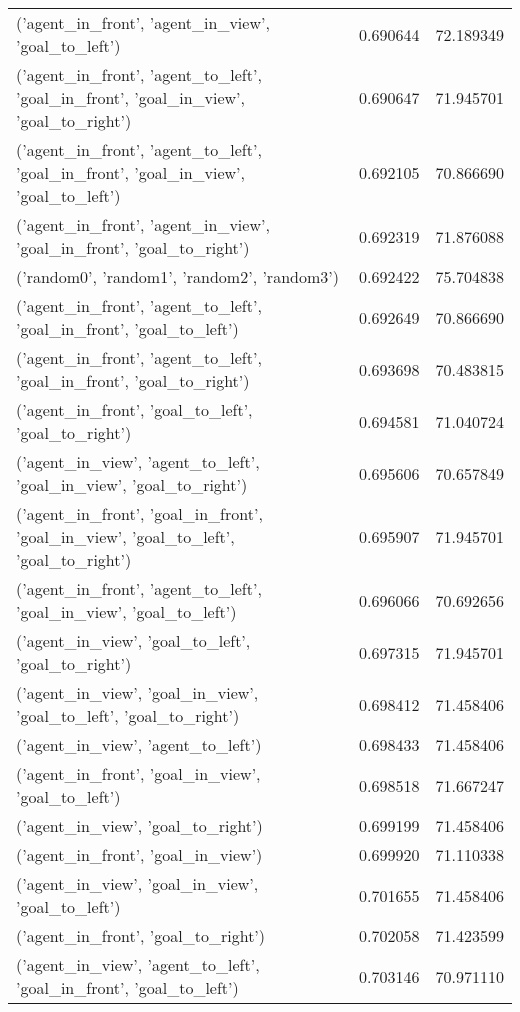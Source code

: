 \begin{tabular}{lrr}
('agent\_in\_front', 'agent\_in\_view', 'goal\_to\_left') & 0.690644 & 72.189349 \\
('agent\_in\_front', 'agent\_to\_left', 'goal\_in\_front', 'goal\_in\_view', 'goal\_to\_right') & 0.690647 & 71.945701 \\
('agent\_in\_front', 'agent\_to\_left', 'goal\_in\_front', 'goal\_in\_view', 'goal\_to\_left') & 0.692105 & 70.866690 \\
('agent\_in\_front', 'agent\_in\_view', 'goal\_in\_front', 'goal\_to\_right') & 0.692319 & 71.876088 \\
('random0', 'random1', 'random2', 'random3') & 0.692422 & 75.704838 \\
('agent\_in\_front', 'agent\_to\_left', 'goal\_in\_front', 'goal\_to\_left') & 0.692649 & 70.866690 \\
('agent\_in\_front', 'agent\_to\_left', 'goal\_in\_front', 'goal\_to\_right') & 0.693698 & 70.483815 \\
('agent\_in\_front', 'goal\_to\_left', 'goal\_to\_right') & 0.694581 & 71.040724 \\
('agent\_in\_view', 'agent\_to\_left', 'goal\_in\_view', 'goal\_to\_right') & 0.695606 & 70.657849 \\
('agent\_in\_front', 'goal\_in\_front', 'goal\_in\_view', 'goal\_to\_left', 'goal\_to\_right') & 0.695907 & 71.945701 \\
('agent\_in\_front', 'agent\_to\_left', 'goal\_in\_view', 'goal\_to\_left') & 0.696066 & 70.692656 \\
('agent\_in\_view', 'goal\_to\_left', 'goal\_to\_right') & 0.697315 & 71.945701 \\
('agent\_in\_view', 'goal\_in\_view', 'goal\_to\_left', 'goal\_to\_right') & 0.698412 & 71.458406 \\
('agent\_in\_view', 'agent\_to\_left') & 0.698433 & 71.458406 \\
('agent\_in\_front', 'goal\_in\_view', 'goal\_to\_left') & 0.698518 & 71.667247 \\
('agent\_in\_view', 'goal\_to\_right') & 0.699199 & 71.458406 \\
('agent\_in\_front', 'goal\_in\_view') & 0.699920 & 71.110338 \\
('agent\_in\_view', 'goal\_in\_view', 'goal\_to\_left') & 0.701655 & 71.458406 \\
('agent\_in\_front', 'goal\_to\_right') & 0.702058 & 71.423599 \\
('agent\_in\_view', 'agent\_to\_left', 'goal\_in\_front', 'goal\_to\_left') & 0.703146 & 70.971110 \\

\end{tabular}
